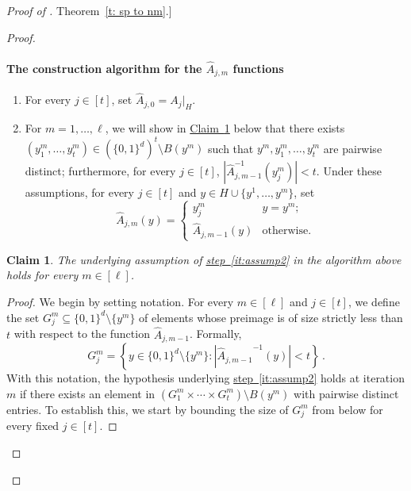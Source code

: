 \documentclass[11pt]{article}
\numberwithin{equation}{section}
\newtheorem{claim}[theorem]{Claim}
\theoremstyle{definition}
\theoremstyle{plain}
\newcommand{\expref}[2]{\hyperref[#2]{#1~\ref{#2}}}
\newcommand{\expeqref}[2]{\hyperref[#2]{#1~\eqref{#2}}}
\newcommand{\adv}{A}
\newcommand{\set}[1]{\left\{{#1}\right\}}
\newcommand{\abs}[1]{\left\lvert #1\right\rvert}
\begin{document}
\begin{proof}[Proof of \expref{Theorem}{t: sp to nm}.]
\begin{proof}
\paragraph{The construction algorithm for the $\widehat{A}_{j,m}$ functions}
\begin{enumerate}
  	\item\label{it:assump1} For every $j \in [t]$, set $\widehat{A}_{j,0} = \adv_{j}|_{H}$. 
%
  	\item\label{it:assump2} For $m = 1,\ldots, \ell$, we will show in \expref{Claim}{c:step 2} below that there exists $(y^m_{1},\ldots,y^m_{t})\in (\{0,1\}^d)^t \setminus B(y^m)$ such that $y^m, y^m_{1},\ldots,y^m_{t}$ are pairwise distinct; furthermore, for every $j \in [t]$, $\abs{\widehat{A}_{j,m-1}^{-1}(y^m_{j})} < t$. Under these assumptions, for every $j \in [t]$ and $y \in H \cup \{y^1,\ldots, y^m\}$, set 
  	\[\widehat{A}_{j,m}(y) = \begin{cases}
  	y^m_{j} &  y = y^m; \\
  	\widehat{A}_{j,m-1}(y) & \text{otherwise}.
  	\end{cases}\]



\end{enumerate}

\begin{claim}\label{c:step 2}
	The underlying assumption of \expeqref{step}{it:assump2} in the algorithm above holds for every $m \in [\ell]$.
\end{claim}

\begin{proof}
We begin by setting  notation.
For every $m \in [\ell]$ and $j \in [t]$, we define the set $G_j^m \subseteq \{0,1\}^d \setminus \{ y^m\}$ of elements whose preimage is of size strictly less than $t$ with respect to the function $\widehat{A}_{j,m-1}$. Formally,
\[G_j^m = \set{y \in \{0,1\}^d \setminus \{ y^m\} : \abs{{\widehat{A}_{j,m-1}}^{-1}(y)} < t}\,.\]
With this notation, the hypothesis underlying \expeqref{step}{it:assump2} holds at iteration $m$ if there exists an element in $(G_1^m \times \cdots \times G_t^m) \setminus B(y^m)$ with pairwise distinct entries. To establish this, we start by bounding the size of $G_j^m$ from below for every fixed $j \in [t]$.


\end{proof}
\end{proof}
\end{proof}
\end{document}
